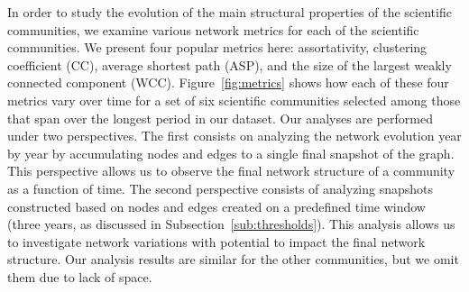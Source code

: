 \documentclass[letterpaper]{www13-companion-accepted}
\begin{document}
In order to study the evolution of the main structural properties of the scientific communities, we examine 
various network metrics for each of the scientific communities. We present four popular metrics here: assortativity, clustering coefficient (CC), average shortest path (ASP), 
and the size of the largest weakly connected component (WCC). Figure~\ref{fig:metrics} shows how each of these four metrics vary over time
for a set of six scientific communities selected among those that span over the longest period in our dataset.  Our analyses are performed under two perspectives. The first
consists on analyzing the network evolution year by year by accumulating nodes and edges to a single final snapshot of the graph. This perspective allows us to observe the final
network structure of a community as a function of time. The second perspective consists of analyzing snapshots constructed based on nodes and edges created on a predefined time
window (three years, as discussed in Subsection~\ref{sub:thresholds}). This analysis allows us to investigate network variations with potential to impact the final network structure.
Our analysis results are similar for the other communities, but we omit them due to lack of space.
\end{document}
